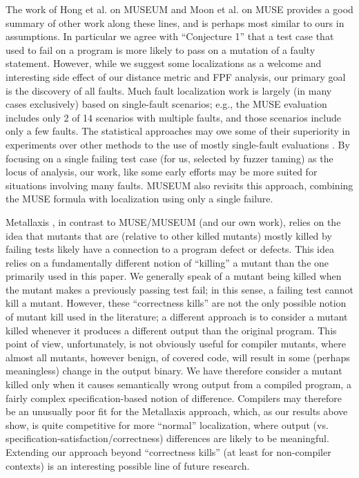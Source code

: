 The work of Hong et al. \cite{multilingual} on MUSEUM and Moon et al. \cite{MUSE} on MUSE provides a good summary of other work along these lines, and is perhaps most similar to ours in assumptions. In particular we agree with ``Conjecture 1'' that a test case that used to fail on a program is more likely to pass on a mutation of a faulty statement.  However, while we suggest some localizations as a welcome and interesting side effect of our distance metric and FPF analysis, our primary goal is the discovery of all faults. Much fault localization work is largely (in many cases exclusively) based on single-fault scenarios; e.g., the MUSE \cite{MUSE} evaluation includes only 2 of 14 scenarios with multiple faults, and those scenarios include only a few faults.   The statistical approaches may owe some of their superiority in experiments over other methods to the use of mostly single-fault evaluations \cite{Jones05}.  By focusing on a single failing test case (for us, selected by fuzzer taming) as the locus of analysis, our work, like some early efforts \cite{NearNeighbor,Cleve05,GroceError} may be more suited for situations involving many faults.  MUSEUM \cite{multilingual} also revisits this approach, combining the MUSE formula with localization using only a single failure.

Metallaxis \cite{Metallaxis,MetalSelect,Papadakis}, in contrast to MUSE/MUSEUM (and our own work), relies on the idea that mutants that are (relative to other killed mutants) mostly killed by failing tests likely have a connection to a program defect or defects.  This idea relies on a fundamentally different notion of ``killing'' a mutant than the one primarily used in this paper.  We generally speak of a mutant being killed when the mutant makes a previously passing test fail; in this sense, a failing test cannot kill a mutant.  However, these ``correctness kills'' are not the only possible notion of mutant kill used in the literature; a different approach is to consider a mutant killed whenever it produces a different output than the original program.  This point of view, unfortunately, is not obviously useful for compiler mutants, where almost all mutants, however benign, of covered code, will result in some (perhaps meaningless) change in the output binary.  We have therefore consider a mutant killed only when it causes semantically wrong output from a compiled program, a fairly complex specification-based notion of difference.  Compilers may therefore be an unusually poor fit for the Metallaxis approach, which, as our results above show, is quite competitive for more ``normal'' localization, where output (vs. specification-satisfaction/correctness) differences are likely to be meaningful.  Extending our approach beyond ``correctness kills'' (at least for non-compiler contexts) is an interesting possible line of future research.

